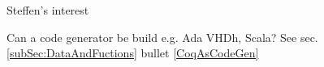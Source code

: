 \section{}

Steffen's interest

Can a code generator be build e.g. Ada VHDh, Scala? See sec. \ref{subSec:DataAndFuctions} bullet \ref{CoqAsCodeGen}